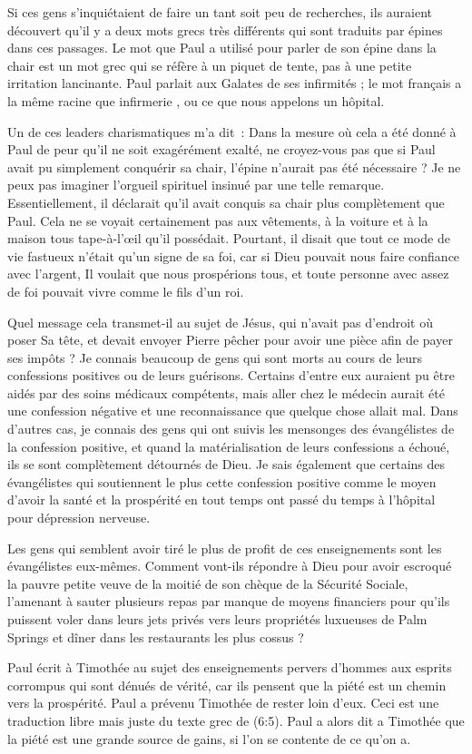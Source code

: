 Si ces gens s'inquiétaient de faire un tant soit peu de recherches,
 ils auraient découvert qu'il y a deux mots grecs très différents
 qui sont traduits par \og épines \fg{} dans ces passages.
 Le mot que Paul a utilisé pour parler de son épine dans la chair
 est un mot grec qui se réfère à un piquet de tente,
 pas à une petite irritation lancinante.
 Paul parlait aux Galates de ses infirmités ;
 le mot français a la même racine que \og infirmerie \fg{},
 ou ce que nous appelons un hôpital.

Un de ces leaders charismatiques m'a dit~:
 \og Dans la mesure où cela a été donné à Paul de peur
 qu'il ne soit exagérément exalté, ne croyez-vous pas que si Paul
 avait pu simplement conquérir sa chair, l'épine n'aurait pas
 été nécessaire ? \fg{}
 Je ne peux pas imaginer l'orgueil spirituel insinué par une telle remarque.
 Essentiellement, il déclarait qu'il avait conquis sa chair
 plus complètement que Paul. Cela ne se voyait certainement pas
 aux vêtements, à la voiture et à la maison tous tape-à-l'œil
 qu'il possédait. Pourtant, il disait que tout ce mode de vie
 fastueux n'était qu'un signe de sa foi, car si Dieu pouvait nous faire
 confiance avec l'argent, Il voulait que nous prospérions tous,
 et toute personne avec assez de foi pouvait vivre comme le fils d'un roi.

Quel message cela transmet-il au sujet de Jésus, qui n'avait pas
 d'endroit où poser Sa tête, et devait envoyer Pierre pêcher
 pour avoir une pièce afin de payer ses impôts ? Je connais beaucoup de gens
 qui sont morts au cours de leurs confessions positives ou de leurs guérisons.
 Certains d'entre eux auraient pu être aidés par des soins médicaux
 compétents, mais aller chez le médecin aurait été une confession négative
 et une reconnaissance que quelque chose allait mal.
 Dans d'autres cas, je connais des gens qui ont suivis les mensonges
 des évangélistes de la confession positive, et quand la matérialisation
 de leurs confessions a échoué, ils se sont complètement détournés de Dieu.
 Je sais également que certains des évangélistes qui soutiennent
 le plus cette confession positive comme le moyen d'avoir la santé
 et la prospérité en tout temps ont passé du temps à l'hôpital
 pour dépression nerveuse.

Les gens qui semblent avoir tiré le plus de profit de ces enseignements
 sont les évangélistes eux-mêmes. Comment vont-ils répondre à Dieu
 pour avoir escroqué la pauvre petite veuve de la moitié de son chèque
 de la Sécurité Sociale, l'amenant à sauter plusieurs repas par manque
 de moyens financiers pour qu'ils puissent voler dans leurs jets privés
 vers leurs propriétés luxueuses de Palm Springs et dîner dans les
 restaurants les plus cossus ?

Paul écrit à Timothée au sujet des enseignements pervers
 d'hom\-mes aux esprits corrompus qui sont dénués de vérité, car ils pensent
 que la piété est un chemin vers la prospérité.
 Paul a prévenu Timothée de rester loin d'eux.
 Ceci est une traduction libre mais juste du texte grec
 de (6:5).
 Paul a alors dit a Timothée que la piété est une grande source de gains,
 si l'on se contente de ce qu'on a.
\closechapter

